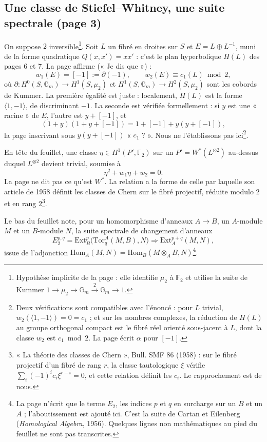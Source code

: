 \documentclass[11pt,a4paper]{article}
\begin{document}
\subsection*{Une classe de Stiefel–Whitney, une suite spectrale (page 3)}

On suppose $2$ inversible\footnote{Hypothèse implicite de la page : elle
identifie $\mu_2$ à $\mathbb{F}_2$ et utilise la suite de Kummer
$1 \to \mu_2 \to \mathbb{G}_m \xrightarrow{2} \mathbb{G}_m \to 1$.}. Soit $L$
un fibré en droites sur $S$ et $E = L \oplus L^{-1}$, muni de la forme
quadratique $Q(x, x') = x x'$ : c'est le plan hyperbolique $H(L)$ des
pages 6 et 7. La page affirme (« Je dis que ») :
\[
w_1(E) = [-1] := \partial(-1), \qquad w_2(E) \equiv c_1(L) \bmod 2,
\]
où $\partial \colon H^{0}(S, \mathbb{G}_m) \to H^{1}(S, \mu_2)$ et
$H^{1}(S, \mathbb{G}_m) \to H^{2}(S, \mu_2)$ sont les cobords de Kummer. La
première égalité est juste : localement, $H(L)$ est la forme
$\langle 1, -1 \rangle$, de discriminant $-1$. La seconde est vérifiée
formellement : si $y$ est une « racine » de $E$, l'autre est $y + [-1]$, et
\[
(1 + y)(1 + y + [-1]) = 1 + [-1] + y(y + [-1]),
\]
la page inscrivant sous $y(y + [-1])$ « $c_1$ ? ». Nous ne l'établissons
pas ici\footnote{Deux vérifications sont compatibles avec l'énoncé : pour
$L$ trivial, $w_2(\langle 1, -1 \rangle) = 0 = c_1$ ; et sur les nombres
complexes, la réduction de $H(L)$ au groupe orthogonal compact est le fibré
réel orienté sous-jacent à $L$, dont la classe $w_2$ est $c_1 \bmod 2$. La
page écrit $\alpha$ pour $[-1]$.}.

En tête du feuillet, une classe $\eta \in H^{1}(P', \mathbb{F}_2)$ sur un
$P' = W^{*}(L^{\otimes 2})$ au-dessus duquel $L^{\otimes 2}$ devient trivial,
soumise à
\[
\eta^{2} + w_1 \eta + w_2 = 0 .
\]
La page ne dit pas ce qu'est $W^{*}$. La relation a la forme de celle par
laquelle son article de 1958 définit les classes de Chern sur le fibré
projectif, réduite modulo $2$ et en rang $2$\footnote{« La théorie des
classes de Chern », Bull. SMF 86 (1958) : sur le fibré projectif d'un fibré
de rang $r$, la classe tautologique $\xi$ vérifie
$\sum_{i} (-1)^{i} c_i \xi^{r-i} = 0$, et cette relation définit les $c_i$.
Le rapprochement est de nous.}.

Le bas du feuillet note, pour un homomorphisme d'anneaux $A \to B$, un
$A$-module $M$ et un $B$-module $N$, la suite spectrale de changement
d'anneaux
\[
E_2^{p,q} = \mathrm{Ext}_B^{p}\bigl(\mathrm{Tor}_q^{A}(M, B), N\bigr)
\Longrightarrow \mathrm{Ext}_A^{p+q}(M, N),
\]
issue de l'adjonction $\mathrm{Hom}_A(M, N) = \mathrm{Hom}_B(M \otimes_A B,
N)$\footnote{La page n'écrit que le terme $E_2$, les indices $p$ et $q$ en
surcharge sur un $B$ et un $A$ ; l'aboutissement est ajouté ici. C'est la
suite de Cartan et Eilenberg (\emph{Homological Algebra}, 1956). Quelques
lignes non mathématiques au pied du feuillet ne sont pas transcrites.}.
\end{document}
